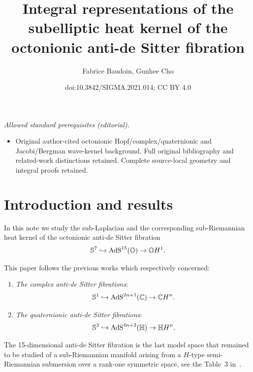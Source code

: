 \documentclass[10pt,a4paper]{amsart}
\title{Integral representations of the subelliptic heat kernel of the octonionic anti-de Sitter fibration}
\author{Fabrice Baudoin, Gunhee Cho}
\date{doi:10.3842/SIGMA.2021.014; CC BY 4.0}
\numberwithin{equation}{section}
\begin{document}
\maketitle
\noindent\textit{Allowed standard prerequisites (editorial).}\begin{itemize}
\item Original author-cited octonionic Hopf/complex/quaternionic and Jacobi/Bergman wave-kernel background. Full original bibliography and related-work distinctions retained. Complete source-local geometry and integral proofs retained.
\end{itemize}\medskip
\section{Introduction and results}

In this note we study the sub-Laplacian and the corresponding sub-Riemannian heat kernel of the octonionic anti-de Sitter fibration
\begin{equation*}
\mathbb{S}^7 \hookrightarrow {\rm AdS}^{15}(\mathbb{O}) \rightarrow \mathbb{O}H^1.
\end{equation*}

This paper follows the previous works \cite{FBND18,FBJW18, JW16} which respectively concerned:
\begin{enumerate}\itemsep=0pt
\item {\it The complex anti-de Sitter fibrations}:
\[
\mathbb{S}^1 \hookrightarrow {\rm AdS}^{2n+1}(\mathbb{C}) \rightarrow {\mathbb{C}H}^n.
\]
\item {\it The quaternionic anti-de Sitter fibrations}:
\[
\mathbb{S}^3 \hookrightarrow {\rm AdS}^{4n+3}(\mathbb{H}) \rightarrow {\mathbb{H}H}^n.
\]
\end{enumerate}

The 15-dimensional anti-de Sitter fibration is the last model space that remained to be studied of a sub-Riemannian manifold arising from a $H$-type semi-Riemannian submersion over a rank-one symmetric space, see the Table~3 in~\cite{BGMR}.
\end{document}
